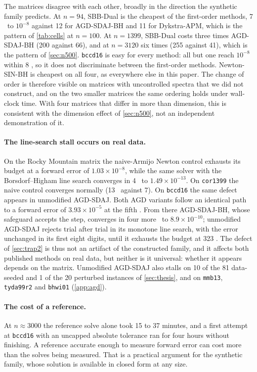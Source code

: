 The matrices disagree with each other, broadly in the direction the
synthetic family predicts. At $n=94$, SBB-Dual is the cheapest of the
first-order methods, 7 \EVDs\ to $10^{-8}$ against 12 for AGD-SDAJ-BH and 11
for Dykstra-APM, which is the pattern of \cref{tab:cells} at $n=100$. At
$n=1399$, SBB-Dual costs three times AGD-SDAJ-BH (200 against 66), and at
$n=3120$ six times (255 against 41), which is the pattern of \cref{sec:n500}.
\texttt{bccd16} is easy for every method: all but one reach $10^{-8}$ within
8 \EVDs, so it does not discriminate between the first-order methods.
Newton-SIN-BH is cheapest on all four, as everywhere else in this paper. The
change of order is therefore visible on matrices with uncontrolled spectra that
we did not construct, and on the two smaller matrices the same ordering holds
under wall-clock time. With four matrices that differ in more than dimension,
this is consistent with the dimension effect of \cref{sec:n500}, not an
independent demonstration of it.

\paragraph{The line-search stall occurs on real data.}
On the Rocky Mountain matrix the naive-Armijo Newton control exhausts its
budget at a forward error of $1.03\times10^{-8}$, while the same solver with
the Borsdorf--Higham line search converges in 4 \EVDs\ to
$1.49\times10^{-13}$. On \texttt{cor1399} the naive control converges normally
(13 \EVDs\ against 7). On \texttt{bccd16} the same defect appears in
unmodified AGD-SDAJ. Both AGD variants follow an identical path to a forward
error of $3.93\times10^{-5}$ at the fifth \EVD. From there AGD-SDAJ-BH, whose
safeguard accepts the step, converges in four more \EVDs\ to
$8.9\times10^{-10}$; unmodified AGD-SDAJ rejects trial after trial in its
monotone line search, with the error unchanged in its first eight digits, until
it exhausts the budget at 323 \EVDs. The defect of \cref{sec:trap2} is thus not
an artifact of the constructed family, and it affects both published methods on
real data, but neither is it universal: whether it appears depends on the
matrix. Unmodified AGD-SDAJ also stalls on 10 of the 81 data-seeded and 1 of
the 20 perturbed instances of \cref{sec:thesis}, and on \texttt{mmb13},
\texttt{tyda99r2} and \texttt{bhwi01} (\cref{app:agd}).

\paragraph{The cost of a reference.}
At $n\approx3000$ the reference solve alone took 15 to 37 minutes, and a first
attempt at \texttt{bccd16} with an uncapped absolute tolerance ran for four
hours without finishing. A reference accurate enough to measure forward error
can cost more than the solves being measured. That is a practical argument for
the synthetic family, whose solution is available in closed form at any size.


